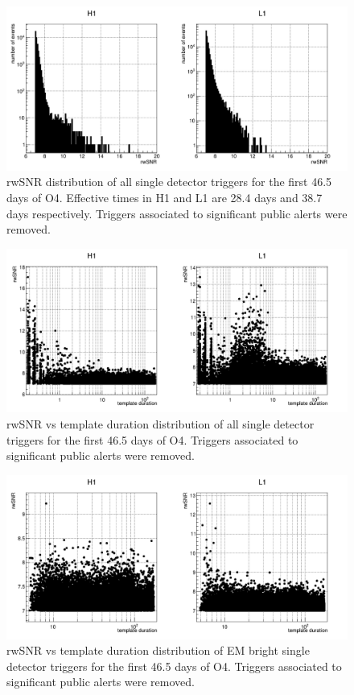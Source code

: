 \begin{figure}
  \centering
  \includegraphics[width=\linewidth]{sectionO4/cRwSnrO4.png}
  \caption{rwSNR distribution of all single detector triggers for the first 46.5 days of O4.
  Effective times in H1 and L1 are 28.4 days and 38.7 days respectively. Triggers associated to significant public alerts were removed.}
  \label{fig:all_singles_O4}
\end{figure}
%
\begin{figure}
  \centering
  \includegraphics[width=\linewidth]{sectionO4/cSnrTempDur_all.png}
  \caption{rwSNR vs template duration distribution of all single detector triggers for the first 46.5 days of O4. Triggers associated to significant public alerts were removed.}
  \label{fig:tempdur_O4}
\end{figure}
%
\begin{figure}
  \centering
  \includegraphics[width=\linewidth]{sectionO4/cSnrTempDur_bright.png}
  \caption{rwSNR vs template duration distribution of EM bright single detector triggers for the first 46.5 days of O4. Triggers associated to significant public alerts were removed.}
  \label{fig:tempdur_embright_O4}
\end{figure}

